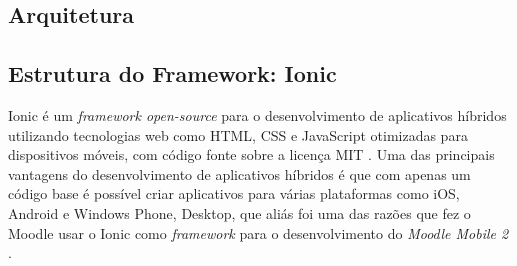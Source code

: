 %

\subsection{Arquitetura}
\subsection{Estrutura do Framework: Ionic}

Ionic é um \textit{framework open-source} para o desenvolvimento de aplicativos
híbridos utilizando tecnologias web como HTML,
CSS e JavaScript otimizadas
para dispositivos móveis, com código fonte sobre a licença MIT \cite{ionic2016}.
Uma das principais vantagens do desenvolvimento de aplicativos híbridos é que com
apenas um código base é possível criar aplicativos para várias plataformas como
iOS, Android e Windows Phone, Desktop, que aliás foi uma das razões que fez o Moodle
usar o Ionic como \textit{framework} para o desenvolvimento do \textit{Moodle Mobile 2} \cite{moodle2016}.

